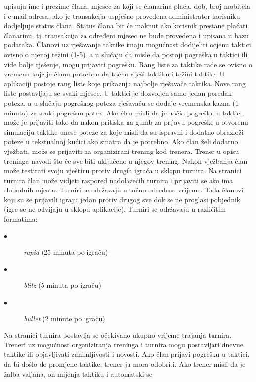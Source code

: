 			upisuju ime i prezime člana, mjesec za koji se članarina plaća, dob,
			broj mobitela i e-mail adresa, ako je transakcija uspješno provedena
			administrator korisniku dodjeljuje status člana. Status člana bit će
			maknut ako korisnik prestane plaćati članarinu, tj. transakcija za
			određeni mjesec ne bude provedena i upisana u bazu podataka. Članovi uz
			rješavanje taktike imaju mogućnost dodijeliti ocjenu taktici ovisno o
			njenoj težini (1-5), a u slučaju da misle da postoji pogreška u taktici
			ili vide bolje rješenje, mogu prijaviti pogrešku. Rang liste za taktike
			rade se ovisno o vremenu koje je članu potrebno da točno riješi taktiku
			i težini taktike. U aplikaciji postoje rang liste koje prikazuju
			najbolje rješavače taktika. Nove rang liste postavljaju se svaki mjesec.
			U taktici je dozvoljen samo jedan poredak poteza, a u slučaju pogrešnog
			poteza rješavaču se dodaje vremenska kazna (1 minuta) za svaki pogrešan
			potez. Ako član misli da je uočio pogrešku u taktici, može je prijaviti
			tako da nakon pritiska na gumb za prijavu pogreške u otvorenu simulaciju
			taktike unese poteze za koje misli da su ispravni i dodatno obrazloži
			poteze u tekstualnoj kućici ako smatra da je potrebno. Ako član želi
			dodatno vježbati, može se prijaviti na organizirani trening kod trenera.
			Trener u opisu treninga navodi što će sve biti uključeno u njegov
			trening. Nakon vježbanja član može testirati svoju vještinu protiv
			drugih igrača u sklopu turnira. Na stranici turnira član može vidjeti
			raspored nadolazećih turnira i prijaviti se ako ima slobodnih mjesta.
			Turniri se održavaju u točno određeno vrijeme. Tada članovi koji su se
			prijavili igraju jedan protiv drugog sve dok se ne proglasi pobjednik
			(igre se ne odvijaju u sklopu aplikacije). Turniri se održavaju u
			različitim formatima:
			\begin{description} 
			\item[$\bullet$] \textit{rapid} (25 minuta po igraču)
		    \item[$\bullet$] \textit{blitz} (5 minuta po igraču)
			\item[$\bullet$] \textit{bullet} (2 minute po igraču)
		    \end{description}
			 Na stranici turnira postavlja se
			očekivano ukupno vrijeme trajanja turnira. Treneri uz mogućnost
			organiziranja treninga i turnira mogu postavljati dnevne taktike ili
			objavljivati zanimljivosti i novosti. Ako član prijavi pogrešku u
			taktici, da bi došlo do promjene taktike, trener ju mora odobriti. Ako
			trener misli da je žalba valjana, on mijenja taktiku i automatski se
